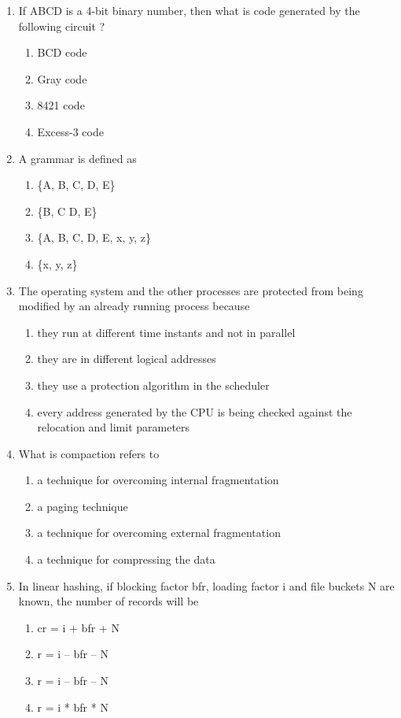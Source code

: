 \documentclass[12pt]{article}
\begin{document}
\begin{enumerate}
\item[11.] If ABCD is a 4-bit binary number, then what is code generated by the following circuit ?
\begin{enumerate}[label=\Alph*.]
  \item BCD code
  \item Gray code
  \item 8421 code
  \item Excess-3 code
\end{enumerate}

\item[12.] A grammar is defined as
\begin{enumerate}[label=\Alph*.]
  \item \{A, B, C, D, E\}
  \item \{B, C D, E\}
  \item \{A, B, C, D, E, x, y, z\}
  \item \{x, y, z\}
\end{enumerate}

\item[13.] The operating system and the other processes are protected from being modified by an already running process because
\begin{enumerate}[label=\Alph*.]
  \item they run at different time instants and not in parallel
  \item they are in different logical addresses
  \item they use a protection algorithm in the scheduler
  \item every address generated by the CPU is being checked against the relocation and limit parameters
\end{enumerate}

\item[14.] What is compaction refers to
\begin{enumerate}[label=\Alph*.]
  \item a technique for overcoming internal fragmentation
  \item a paging technique
  \item a technique for overcoming external fragmentation
  \item a technique for compressing the data
\end{enumerate}

\item[15.] In linear hashing, if blocking factor bfr, loading factor i and file buckets N are known, the number of records will be
\begin{enumerate}[label=\Alph*.]
  \item cr = i + bfr + N
  \item r = i – bfr – N
  \item r = i – bfr – N
  \item r = i * bfr * N
\end{enumerate}


\end{enumerate}
\end{document}
